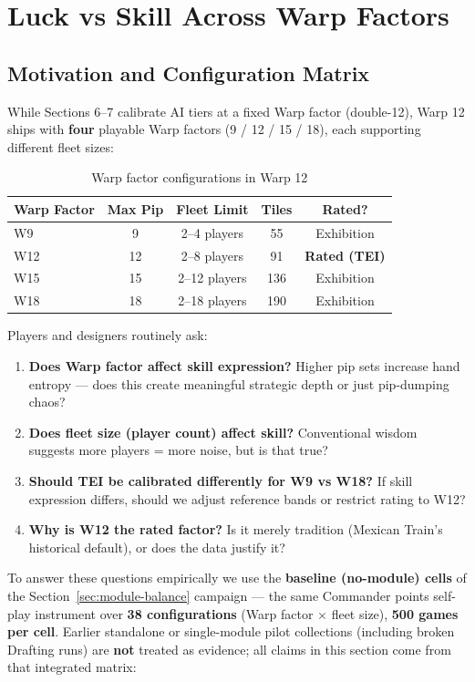 \documentclass[11pt,letterpaper]{article}
\begin{document}
\section{Luck vs Skill Across Warp Factors}
\label{sec:luck-skill-boards}

\subsection{Motivation and Configuration Matrix}

While Sections 6--7 calibrate AI tiers at a fixed Warp factor (double-12), Warp 12 ships with \textbf{four} playable Warp factors (9 / 12 / 15 / 18), each supporting different fleet sizes:

\begin{table}[h]
\centering
\begin{tabular}{@{}lcccc@{}}
\toprule
\textbf{Warp Factor} & \textbf{Max Pip} & \textbf{Fleet Limit} & \textbf{Tiles} & \textbf{Rated?} \\
\midrule
W9 & 9 & 2--4 players & 55 & Exhibition \\
W12 & 12 & 2--8 players & 91 & \textbf{Rated (TEI)} \\
W15 & 15 & 2--12 players & 136 & Exhibition \\
W18 & 18 & 2--18 players & 190 & Exhibition \\
\bottomrule
\end{tabular}
\caption{Warp factor configurations in Warp 12}
\end{table}

Players and designers routinely ask:
\begin{enumerate}
\item \textbf{Does Warp factor affect skill expression?} Higher pip sets increase hand entropy --- does this create meaningful strategic depth or just pip-dumping chaos?
\item \textbf{Does fleet size (player count) affect skill?} Conventional wisdom suggests more players = more noise, but is that true?
\item \textbf{Should TEI be calibrated differently for W9 vs W18?} If skill expression differs, should we adjust reference bands or restrict rating to W12?
\item \textbf{Why is W12 the rated factor?} Is it merely tradition (Mexican Train's historical default), or does the data justify it?
\end{enumerate}

To answer these questions empirically we use the \textbf{baseline (no-module) cells} of the Section~\ref{sec:module-balance} campaign --- the same Commander points self-play instrument over \textbf{38 configurations} (Warp factor $\times$ fleet size), \textbf{500 games per cell}. Earlier standalone or single-module pilot collections (including broken Drafting runs) are \textbf{not} treated as evidence; all claims in this section come from that integrated matrix:
\end{document}

